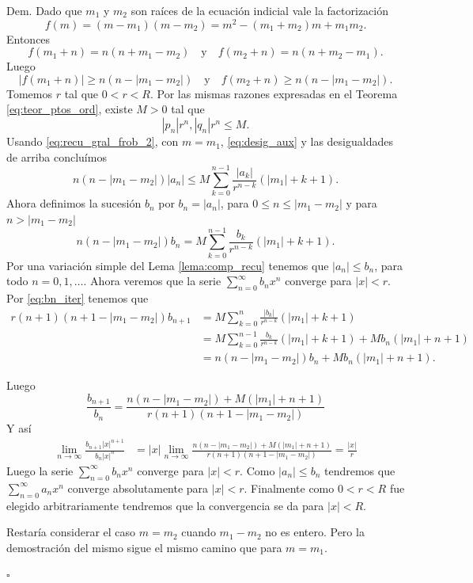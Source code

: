 \documentclass{article}
\newenvironment{demo}{\noindent\emph{Dem.}}{{\hspace*{\fill}$\square$} \newline\vspace{5pt}}
\newcounter{defi_cont}
\newcounter{teor_cont}
\newcounter{lem_cont}
\renewcommand{\emph}[1]{\textcolor[rgb]{0,0,1}{#1}}
\begin{document}
\begin{demo} Dado que $m_1$ y $m_2$ son raíces de la ecuación indicial vale la factorización
\[f(m)=(m-m_1)(m-m_2)=m^2-(m_1+m_2)m+m_1m_2.\]
Entonces
\[f(m_1+n)=n(n+m_1-m_2)\quad\text{y}\quad f(m_2+n)=n(n+m_2-m_1).\]
Luego
\begin{equation}\label{eq:desig_aux}|f(m_1+n)|\geq n(n-|m_1-m_2|)\quad\text{y}\quad f(m_2+n)\geq n(n-|m_1-m_2|).
\end{equation}
Tomemos $r$ tal que $0<r<R$. Por las mismas razones expresadas  en el Teorema \eqref{eq:teor_ptos_ord},  existe $M>0$ tal que
\[ |p_n|r^n,|q_n|r^n\leq M.\]
Usando \eqref{eq:recu_gral_frob_2}, con $m=m_1$, \eqref{eq:desig_aux} y las desigualdades de arriba concluímos
\[n(n-|m_1-m_2|)|a_n|\leq M\sum_{k=0}^{n-1}\frac{|a_k|}{r^{n-k}}(|m_1|+k+1).\]
Ahora definimos la sucesión $b_n$ por $b_n=|a_n|$, para $0\leq n\leq|m_1-m_2|$ y para $ n>|m_1-m_2|$
\begin{equation}\label{eq:bn_iter}n(n-|m_1-m_2|)b_n= M\sum_{k=0}^{n-1}\frac{b_k}{r^{n-k}}(|m_1|+k+1).\end{equation}
Por una variación simple  del Lema \ref{lema:comp_recu} tenemos que $|a_n|\leq b_n$, para todo $n=0,1,\ldots$. Ahora veremos que la serie $\sum_{n=0}^{\infty}b_nx^n$ converge para  $|x|<r$. Por \eqref{eq:bn_iter} tenemos que
\[ 
   \begin{split}
     r(n+1)(n+1-|m_1-m_2|)b_{n+1}&=M\sum_{k=0}^{n}\frac{|b_k|}{r^{n-k}}(|m_1|+k+1)\\
&=M\sum_{k=0}^{n-1}\frac{b_k}{r^{n-k}}(|m_1|+k+1)+Mb_n(|m_1|+n+1)\\
&=n(n-|m_1-m_2|)b_n+Mb_n(|m_1|+n+1).
  \end{split}
\]

Luego
\[\frac{b_{n+1}}{b_n}=\frac{ n(n-|m_1-m_2|)+M(|m_1|+n+1) }{ r(n+1)(n+1-|m_1-m_2|)  }\]
Y así
\[ \begin{split}
\lim_{n\to\infty}\frac{b_{n+1}|x|^{n+1}}{b_n|x|^n}&=|x|\lim_{n\to\infty}\frac{ n(n-|m_1-m_2|)+M(|m_1|+n+1) }{ r(n+1)(n+1-|m_1-m_2|)  }=\frac{|x|}{r}
\end{split}
\]
Luego la serie  $\sum_{n=0}^{\infty}b_nx^n$   converge para $|x|<r$. Como $|a_n|\leq b_n$ tendremos que  $\sum_{n=0}^{\infty}a_nx^n$ converge absolutamente para $|x|<r$. Finalmente como $0<r<R$ fue elegido arbitrariamente tendremos que la convergencia se da para $|x|<R$. 

Restaría considerar el caso $m=m_2$ cuando $m_1-m_2$ no es entero. Pero la demostración del mismo sigue el mismo camino que para $m=m_1$.

\end{demo}
\end{document}
